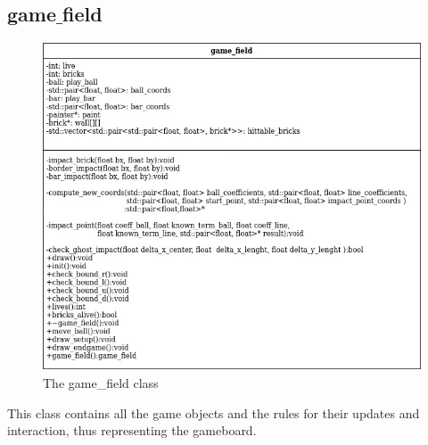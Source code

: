 \documentclass[]{article}
\begin{document}
\subsection{game$\_$field}
\begin{figure}[h!]
    \centering
    \includegraphics[scale=0.5]{game_field.jpg}
    \caption{The game\_field class}
    \label{fig:game_field diagram }
\end{figure}
This class contains all the game objects and the rules for their updates and interaction, thus representing the gameboard.
\end{document}

